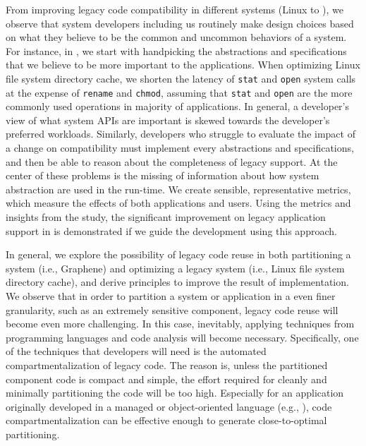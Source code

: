 From improving legacy code compatibility in different systems
(Linux to \graphene{}),
we observe that system developers including us
routinely make design choices based on 
what they believe to be the common and uncommon behaviors of a system.
For instance, in \graphene{}, we start with handpicking the abstractions and specifications
that we believe to be more important to the applications.
When optimizing Linux file system directory cache,
we shorten the latency of {\tt stat} and {\tt open} system calls
at the expense of {\tt rename} and {\tt chmod},
assuming that {\tt stat} and {\tt open} are the more commonly used operations in majority of applications.
In general,
a developer's view of what system APIs are important is skewed towards
the developer's preferred workloads.
Similarly, developers who struggle to evaluate the impact of a 
change on compatibility
must implement every abstractions and specifications,
and then be able to reason about the completeness of legacy support.
At the center of these problems is the missing of information about how system abstraction are used in the run-time.
We create sensible, representative metrics,
which measure the effects of both applications and users.
Using the metrics and insights from the study,
the significant improvement on legacy application support in \graphene{} is demonstrated
if we guide the development using this approach.


In general, we explore the possibility of legacy code reuse in both
partitioning a system
(i.e., Graphene) and
optimizing a legacy system
(i.e., Linux file system directory cache),
and derive principles to improve the result of implementation.
We observe that in order to partition a system or application
in a even finer granularity,
such as an extremely sensitive component,
legacy code reuse will become even more challenging.
In this case,
inevitably, applying techniques from programming languages and code analysis
will become necessary.
Specifically, one of the techniques that developers will need is the automated compartmentalization of legacy code.
The reason is, 
unless the partitioned component code is compact and simple,
the effort required
for cleanly and minimally partitioning the code
will be too high.
Especially for an application originally developed in a managed or object-oriented language (e.g., \java{}),
code compartmentalization can be effective enough to generate close-to-optimal partitioning.

